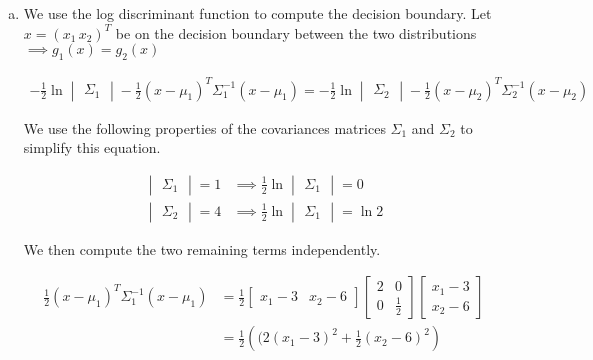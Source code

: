 \documentclass[a4paper, 10pt, twoside]{article}
\begin{document}
\begin{enumerate}[a)]
    \item We use the log discriminant function to compute the decision boundary. Let $x = (x_1 \, x_2)^T$ be on the decision boundary between the two distributions $\implies g_1(x) = g_2(x)$

          \begin{align}
              - \frac{1}{2} \ln \begin{vmatrix} \Sigma_1 \end{vmatrix}
              - \frac{1}{2} (x - \mu_1)^T \Sigma_1^{-1}(x - \mu_1)
              =
              - \frac{1}{2} \ln \begin{vmatrix} \Sigma_2 \end{vmatrix}
              - \frac{1}{2} (x - \mu_2)^T \Sigma_2^{-1}(x - \mu_2)\label{eq:3}
          \end{align}

          We use the following properties of the covariances matrices $\Sigma_1$ and $\Sigma_2$ to simplify this equation.

          \begin{align*}
              \begin{vmatrix}\Sigma_1\end{vmatrix} = 1 & \implies \frac{1}{2} \ln \begin{vmatrix}\Sigma_1\end{vmatrix} = 0     \\
              \begin{vmatrix}\Sigma_2\end{vmatrix} = 4 & \implies \frac{1}{2} \ln \begin{vmatrix}\Sigma_1\end{vmatrix} = \ln 2
          \end{align*}

          We then compute the two remaining terms independently.

          \begin{align*}
              \frac{1}{2} (x - \mu_1)^T \Sigma_1^{-1}(x - \mu_1)
               & =
              \frac{1}{2}
              \begin{bmatrix}x_1-3 & x_2-6\end{bmatrix}
              \begin{bmatrix}2 & 0 \\ 0 & \frac{1}{2}\end{bmatrix}
              \begin{bmatrix}x_1-3 \\ x_2-6\end{bmatrix} \\
               & =
              \frac{1}{2}\left((2(x_1-3)^2 + \frac{1}{2}(x_2-6)^2\right)
          \end{align*}


\end{enumerate}
\end{document}
